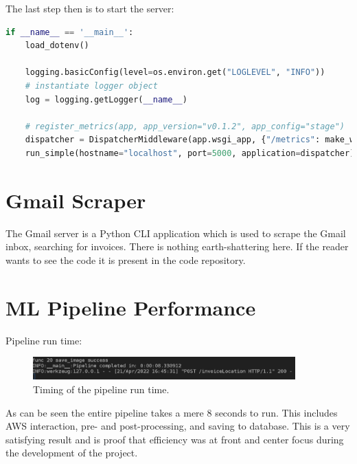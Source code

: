 The last step then is to start the server:
\begin{lstlisting}[language=python, caption={Starting the Server.}, label=server_start]
if __name__ == '__main__':
	load_dotenv()

	logging.basicConfig(level=os.environ.get("LOGLEVEL", "INFO"))
	# instantiate logger object
	log = logging.getLogger(__name__)

	# register_metrics(app, app_version="v0.1.2", app_config="stage")
	dispatcher = DispatcherMiddleware(app.wsgi_app, {"/metrics": make_wsgi_app()})
	run_simple(hostname="localhost", port=5000, application=dispatcher)
\end{lstlisting}
\section{Gmail Scraper}
The Gmail server is a Python CLI application which is used to scrape the Gmail inbox, searching for invoices. There is nothing
earth-shattering here. If the reader wants to see the code it is present in the code repository.
\section{ML Pipeline Performance}
Pipeline run time:
\begin{figure}[H]
	\centering
	\includegraphics[width=0.9\textwidth]{figures/pipeline_time.png}
	\caption{Timing of the pipeline run time.}
	\label{fig:pipeline_run_time}
\end{figure}
As can be seen the entire pipeline takes a mere 8 seconds to run. This includes AWS interaction,
pre- and post-processing, and saving to database. This is a very satisfying result and is proof that efficiency was at front and
center focus during the development of the project.

